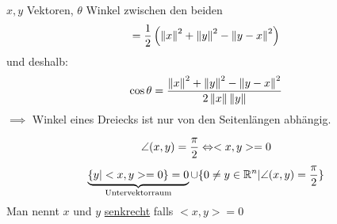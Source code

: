 \begin{Kor}
$x,y$ Vektoren, $\theta$ Winkel zwischen den beiden
\[<x,y>=\frac{1}{2}\left(\Norm{x}^2+\Norm{y}^2-\Norm{y-x}^2\right)\]
und deshalb:
\[\cos\theta=\frac{\left\| x \right\|^2+\left\| y \right\|^2-\left\| y-x \right\|^2}{2\left\| x \right\|\left\| y \right\|}\]
$\implies$ Winkel eines Dreiecks ist nur von den Seitenlängen abhängig.
\end{Kor}
\begin{Bsp}
\[\angle(x,y)=\frac{\pi}{2}\Leftrightarrow <x,y>=0\]
\[\underbrace{\{y|<x,y>=0\}={0}}_{\text{Untervektorraum}}\cup\{0\neq y\in\mathbb{R}^n|\angle(x,y)=\frac{\pi}{2}\}\]
Man nennt $x$ und $y$ \underline{senkrecht} falls $<x,y>=0$
\end{Bsp}
